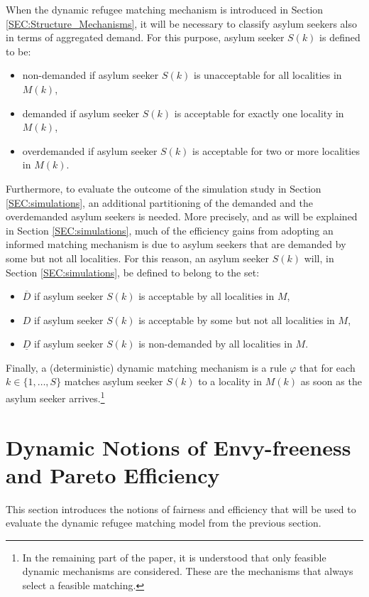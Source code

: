 \documentclass[12pt,fleqn]{article}
\begin{document}
When the dynamic refugee matching mechanism is introduced in Section \ref{SEC:Structure_Mechanisms}, it will be necessary to classify asylum seekers also in terms of aggregated demand. For this purpose, asylum seeker $S(k)$ is defined to be:
\begin{itemize}
\item non-demanded if asylum seeker $S(k)$ is unacceptable for all localities in $M(k)$,

\item demanded if asylum seeker $S(k)$ is acceptable for exactly one locality in $M(k)$,

\item overdemanded if asylum seeker $S(k)$ is acceptable for two or more localities in $M(k)$.
\end{itemize}
\noindent Furthermore, to evaluate the outcome of the simulation study in Section \ref{SEC:simulations}, an additional partitioning of the demanded and the overdemanded asylum seekers is needed. More precisely, and as will be explained in Section \ref{SEC:simulations}, much of the efficiency gains from adopting an informed matching mechanism is due to asylum seekers that are demanded by some but not all localities. For this reason, an asylum seeker $S(k)$ will, in Section \ref{SEC:simulations}, be defined to belong to the set:
\begin{itemize}
\item $\overline{D}$ if asylum seeker $S(k)$ is acceptable by all localities in $M$,

\item $D$ if asylum seeker $S(k)$ is acceptable by some but not all localities in $M$,

\item $\underline{D}$ if asylum seeker $S(k)$ is non-demanded by all localities in $M$.
\end{itemize}
\noindent Finally, a (deterministic) dynamic matching mechanism is a rule $\varphi$ that for each $k\in\{1,\ldots,S\}$ matches asylum seeker $S(k)$ to a locality in $M(k)$ as soon as the asylum seeker arrives.\footnote{In the remaining part of the paper, it is understood that only feasible dynamic mechanisms are considered. These are the mechanisms that always select a feasible matching.}

\section{Dynamic Notions of Envy-freeness and Pareto Efficiency}\label{SEC:Fair_Efficient}
This section introduces the notions of fairness and efficiency that will be used to evaluate the dynamic refugee matching model from the previous section.
\end{document}
